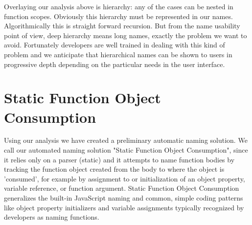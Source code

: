 \documentclass[10pt, preprint]{sigplanconf}
\begin{document}
{Overlaying our analysis above is hierarchy: any of the cases can be nested in function scopes. Obviously this hierarchy must be represented in our names. Algorithmically this is straight forward recursion. But from the name usability point of view, deep hierarchy means long names, exactly the problem we want to avoid. Fortunately developers are well trained in dealing with this kind of problem and we anticipate  that hierarchical names can be shown to users in progressive depth depending on the particular needs in the user interface.



\section{Static  Function Object Consumption}
Using our analysis we have created a preliminary automatic naming solution.  
We call our automated naming solution "Static Function Object Consumption", since it relies only on a parser (static) and it attempts to name function bodies by tracking the function object created from the body to where the object is 'consumed', for example by assignment to or initialization of  an object property, variable reference, or function argument.
Static Function Object Consumption generalizes the built-in JavaScript naming and common, simple coding patterns like object property initializers and variable assignments typically recognized by developers as naming functions.

}
\end{document}
